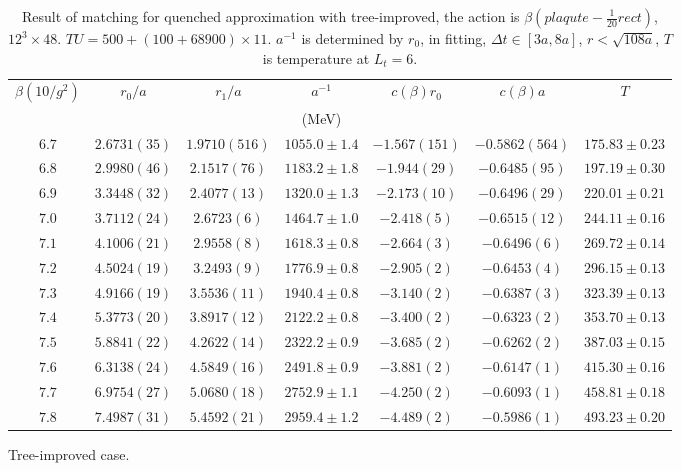 \begin{table}
\begin{center}
\begin{tabular}{c|c|c|c|c|c|c}
    \hline    
$\beta(10/g^2)$ & $r_0/a$ & $r_1/a$ & $a^{-1}$ & $c(\beta)r_0$ & $c(\beta)a$ & $T$\\
& & & (MeV) & & \\
\hline
$6.7$ & $2.6731(35)$ & $1.9710(516)$ & $1055.0\pm 1.4$ & $-1.567(151)$ & $-0.5862(564)$ & $175.83\pm 0.23$\\
\hline
$6.8$ & $2.9980(46)$ & $2.1517(76)$  & $1183.2\pm 1.8$ & $-1.944(29)$  & $-0.6485(95)$  & $197.19\pm 0.30$\\
\hline
$6.9$ & $3.3448(32)$ & $2.4077(13)$  & $1320.0\pm 1.3$ & $-2.173(10)$  & $-0.6496(29)$  & $220.01\pm 0.21$\\
\hline
$7.0$ & $3.7112(24)$ & $2.6723(6)$   & $1464.7\pm 1.0$ & $-2.418(5)$   & $-0.6515(12)$  & $244.11\pm 0.16$\\ 
\hline
$7.1$ & $4.1006(21)$ & $2.9558(8)$   & $1618.3\pm 0.8$ & $-2.664(3)$   & $-0.6496(6)$   & $269.72\pm 0.14$\\
\hline
$7.2$ & $4.5024(19)$ & $3.2493(9)$   & $1776.9\pm 0.8$ & $-2.905(2)$   & $-0.6453(4)$   & $296.15\pm 0.13$\\
\hline
$7.3$ & $4.9166(19)$ & $3.5536(11)$  & $1940.4\pm 0.8$ & $-3.140(2)$   & $-0.6387(3)$   & $323.39\pm 0.13$\\
\hline
$7.4$ & $5.3773(20)$ & $3.8917(12)$  & $2122.2\pm 0.8$ & $-3.400(2)$   & $-0.6323(2)$   & $353.70\pm 0.13$\\
\hline
$7.5$ & $5.8841(22)$ & $4.2622(14)$  & $2322.2\pm 0.9$ & $-3.685(2)$   & $-0.6262(2)$   & $387.03\pm 0.15$\\
\hline
$7.6$ & $6.3138(24)$ & $4.5849(16)$  & $2491.8\pm 0.9$ & $-3.881(2)$   & $-0.6147(1)$   & $415.30\pm 0.16$\\
\hline
$7.7$ & $6.9754(27)$ & $5.0680(18)$  & $2752.9\pm 1.1$ & $-4.250(2)$   & $-0.6093(1)$   & $458.81\pm 0.18$\\
\hline
$7.8$ & $7.4987(31)$ & $5.4592(21)$  & $2959.4\pm 1.2$ & $-4.489(2)$   & $-0.5986(1)$   & $493.23\pm 0.20$\\
\hline
\end{tabular}
\end{center}
\caption{\label{tab.res.matchingquench4}Result of matching for quenched approximation with tree-improved, the action is $\beta(plaqute -\frac{1}{20}rect)$, $12^3 \times 48$. $TU=500+(100+68900)\times 11$. $a^{-1}$ is determined by $r_0$, in fitting, $\Delta t \in [3a, 8a]$, $r< \sqrt{108a}$, $T$ is temperature at $L_t=6$.}
\end{table}
Tree-improved case.